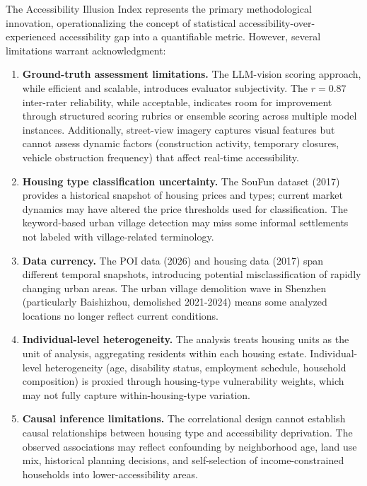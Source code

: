 \documentclass[preprint,12pt,authoryear]{elsarticle}
\begin{document}
The Accessibility Illusion Index represents the primary methodological innovation, operationalizing the concept of statistical accessibility-over-experienced accessibility gap into a quantifiable metric. However, several limitations warrant acknowledgment:

\begin{enumerate}
    \item \textbf{Ground-truth assessment limitations.} The LLM-vision scoring approach, while efficient and scalable, introduces evaluator subjectivity. The $r = 0.87$ inter-rater reliability, while acceptable, indicates room for improvement through structured scoring rubrics or ensemble scoring across multiple model instances. Additionally, street-view imagery captures visual features but cannot assess dynamic factors (construction activity, temporary closures, vehicle obstruction frequency) that affect real-time accessibility.
    
    \item \textbf{Housing type classification uncertainty.} The SouFun dataset (2017) provides a historical snapshot of housing prices and types; current market dynamics may have altered the price thresholds used for classification. The keyword-based urban village detection may miss some informal settlements not labeled with village-related terminology.
    
    \item \textbf{Data currency.} The POI data (2026) and housing data (2017) span different temporal snapshots, introducing potential misclassification of rapidly changing urban areas. The urban village demolition wave in Shenzhen (particularly Baishizhou, demolished 2021-2024) means some analyzed locations no longer reflect current conditions.
    
    \item \textbf{Individual-level heterogeneity.} The analysis treats housing units as the unit of analysis, aggregating residents within each housing estate. Individual-level heterogeneity (age, disability status, employment schedule, household composition) is proxied through housing-type vulnerability weights, which may not fully capture within-housing-type variation.
    
    \item \textbf{Causal inference limitations.} The correlational design cannot establish causal relationships between housing type and accessibility deprivation. The observed associations may reflect confounding by neighborhood age, land use mix, historical planning decisions, and self-selection of income-constrained households into lower-accessibility areas.
\end{enumerate}
\end{document}
